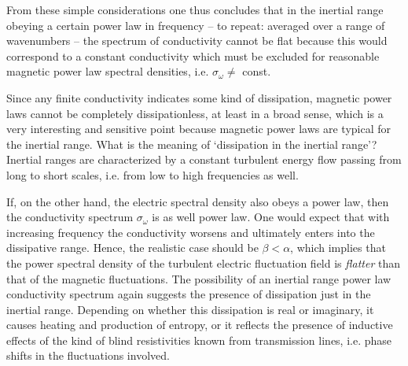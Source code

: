 \documentclass[ ]{copernicus2}
\begin{document}
{{From these simple considerations one thus concludes that in the inertial range obeying a certain power law in frequency -- to repeat: averaged over a range of wavenumbers -- the spectrum of conductivity cannot be flat because this would correspond to a constant conductivity which must be excluded for reasonable magnetic power law spectral densities, i.e. $\sigma_\omega\neq$ const. {Since any finite conductivity indicates some kind of dissipation, magnetic power laws cannot be completely dissipationless, at least in a broad sense, which is a {very interesting and sensitive point because} magnetic power laws are typical for the inertial range. {What is the meaning of `dissipation in the inertial range'? Inertial ranges are characterized \citep{kolmogorov1941} by a constant turbulent energy flow passing from long to short scales, i.e. from low to high frequencies as well. }

If, on the other hand, the electric spectral density also obeys a power law, then the conductivity spectrum $\sigma_\omega$ is as well power law. One would expect that with increasing frequency the conductivity worsens and ultimately enters into the dissipative range. Hence, the realistic case should be $\beta<\alpha$, which implies that the power spectral density of the turbulent electric fluctuation field is \emph{flatter} than that of the magnetic fluctuations. {The possibility of an inertial range power law conductivity spectrum again suggests the presence of dissipation just in the inertial range. Depending on whether this dissipation is real or imaginary, it causes heating and production of entropy, or it reflects the presence of inductive effects of the kind of blind resistivities known from transmission lines, i.e. phase shifts in the fluctuations involved.}

}}}
\end{document}
